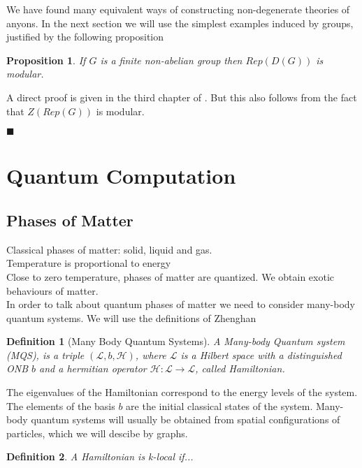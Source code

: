 \documentclass{article}
\newtheorem{definition}{Definition}
\newtheorem{proposition}[theorem]{Proposition}
\newenvironment{proof}[1][Proof]{\begin{trivlist}
\item[\hskip \labelsep {\bfseries #1}]}{\begin{flushright}$\blacksquare$\end{flushright} \end{trivlist}}
\begin{document}
We have found many equivalent ways of constructing non-degenerate theories of anyons. In the next section we will use the simplest examples induced by groups, justified by the following proposition
\begin{proposition}
	If $G$ is a finite non-abelian group then $Rep(D(G))$ is modular.
\end{proposition}
\begin{proof}
	A direct proof is given in the third chapter of \cite{Bakalov00}. But this also follows from the fact that $Z(Rep(G))$ is modular.
\end{proof}



\section{Quantum Computation}

\subsection{Phases of Matter}
Classical phases of matter: solid, liquid and gas.\\
Temperature is proportional to energy \\
Close to zero temperature, phases of matter are quantized. We obtain exotic behaviours of matter.\\
In order to talk about quantum phases of matter we need to consider many-body quantum systems. We will use the definitions of Zhenghan

\begin{definition}[Many Body Quantum Systems]
A Many-body Quantum system (MQS), is a triple $(\mathcal{L}, b, \mathcal{H})$, where $\mathcal{L}$ is a Hilbert space with a distinguished ONB $b$ and a hermitian operator $\mathcal{H}: \mathcal{L} \rightarrow \mathcal{L}$, called Hamiltonian.
\end{definition}
The eigenvalues of the Hamiltonian correspond to the energy levels of the system. The elements of the basis $b$ are the initial classical states of the system. Many-body quantum systems will usually be obtained from spatial configurations of particles, which we will descibe by graphs.
\begin{definition}
A Hamiltonian is k-local if...
\end{definition}
\end{document}
